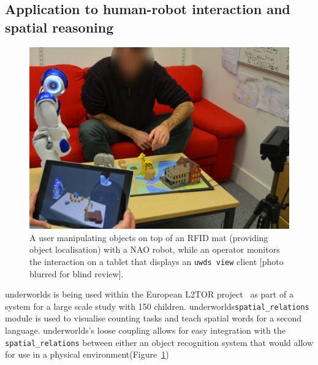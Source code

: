 \documentclass[letterpaper, 10pt, conference]{ieeeconf}
\newcommand{\uwds}{{\sc underworlds}\xspace}
\begin{document}
\subsection{Application to human-robot interaction and spatial reasoning}

\begin{figure}
    \centering
    \includegraphics[width=\linewidth]{l2tor-photo2-blind}
    \caption{A user manipulating objects on top of an RFID mat (providing object
    localisation) with a NAO robot, while an operator monitors
    the interaction on a tablet that displays an {\tt uwds view} client [photo blurred for blind review].}

    \label{fig|l2torexample}
\end{figure}

\uwds is being used within the European L2TOR project~\cite{belpaeme2015l2tor} as part of a system for a large scale study with 150 children. \uwds {\tt spatial\_relations} module is used to visualise counting tasks and teach spatial words for a second language. \uwds's loose coupling allows for easy integration with the {\tt spatial_relations} between either an object recognition system that would allow for use in a physical environment(Figure~\ref{fig|l2torexample})


\end{document}
